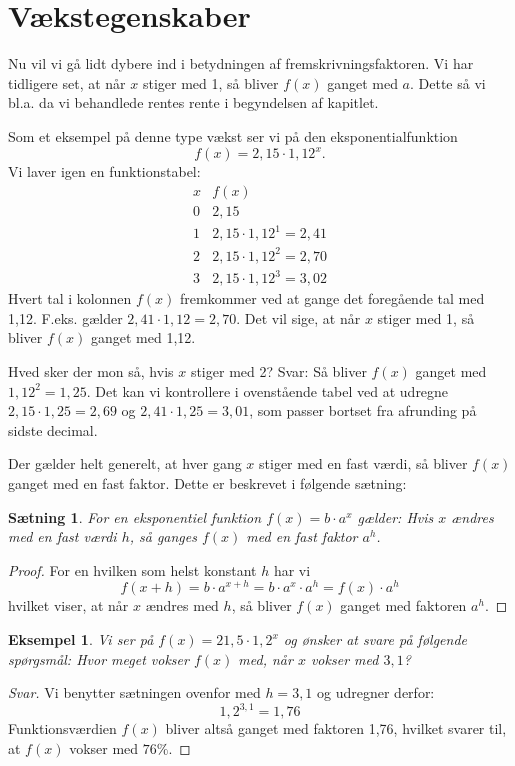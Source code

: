 \documentclass[12pt,oneside,a4paper]{article}
\theoremstyle{plain}
\newtheorem*{thm}{Sætning}
\newtheorem*{eks}{Eksempel}
\begin{document}
\section*{Vækstegenskaber}
Nu vil vi gå lidt dybere ind i betydningen af fremskrivningsfaktoren. Vi har tidligere
set, at når $x$ stiger med 1, så bliver $f(x)$ ganget med $a$. Dette så vi bl.a. da
vi behandlede rentes rente i begyndelsen af kapitlet.

Som et eksempel på denne type vækst ser vi på den eksponentialfunktion
$$
f(x) = 2,15 \cdot 1,12^x.
$$
Vi laver igen en funktionstabel:
$$
\begin{array}{r|l}
    x & f(x) \\
    \hline
    0 & 2,15 \\
    1 & 2,15 \cdot 1,12^1 = 2,41 \\
    2 & 2,15 \cdot 1,12^2 = 2,70 \\
    3 & 2,15 \cdot 1,12^3 = 3,02
\end{array}
$$
Hvert tal i kolonnen $f(x)$ fremkommer ved at gange det foregående tal med
1,12. F.eks. gælder $2,41 \cdot 1,12 = 2,70$. Det vil sige, at når $x$ stiger
med 1, så bliver $f(x)$ ganget med 1,12.

Hved sker der mon så, hvis $x$ stiger med 2? Svar: Så bliver $f(x)$ ganget med
$1,12^2 = 1,25$.  Det kan vi kontrollere i ovenstående tabel ved at udregne
$2,15\cdot1,25 = 2,69$ og $2,41\cdot1,25 = 3,01$, som passer bortset fra afrunding på
sidste decimal.

Der gælder helt generelt, at hver gang $x$ stiger med en fast værdi, så bliver
$f(x)$ ganget med en fast faktor. Dette er beskrevet i følgende sætning:

\begin{thm}
    For en eksponentiel funktion $f(x) = b\cdot a^x$ gælder: Hvis $x$ ændres
    med en fast værdi $h$, så ganges $f(x)$ med en fast faktor $a^h$.
\end{thm}
\begin{proof}
    For en hvilken som helst konstant $h$ har vi
    $$
    f(x+h) = b\cdot a^{x+h} = b\cdot a^x\cdot  a^h = f(x)\cdot  a^h
    $$
    hvilket viser, at når $x$ ændres med $h$, så bliver $f(x)$ ganget med
    faktoren $a^h$. 
\end{proof}

\begin{eks}
    Vi ser på $f(x) = 21,5 \cdot 1,2^x$ og ønsker at svare på følgende
    spørgsmål: Hvor meget vokser $f(x)$ med, når $x$ vokser med $3,1$?
\end{eks}
\begin{proof}[Svar]
    Vi benytter sætningen ovenfor med $h=3,1$ og udregner derfor:
    $$
    1,2^{3,1} = 1,76 
    $$
    Funktionsværdien $f(x)$ bliver altså ganget med faktoren 1,76, hvilket
    svarer til, at $f(x)$ vokser med $76\%$.
\end{proof}
\end{document}
